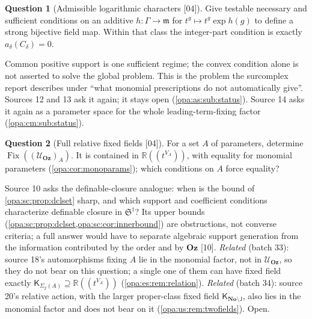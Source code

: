 \documentclass[11pt,oneside]{article}
\numberwithin{equation}{section}
\theoremstyle{definition}
\newtheorem{question}[question]{Question}
\theoremstyle{remark}
\newcommand{\No}{\mathbf{No}}
\newcommand{\Oz}{\mathbf{Oz}}
\newcommand{\R}{\mathbb R}
\newcommand{\mm}{\mathfrak m}
\newcommand{\UU}{\mathcal U}
\newcommand{\Fix}{\operatorname{Fix}}
\newcommand{\Hahn}[2]{#1((t^{#2}))}
\newcommand{\src}[1]{\textup{\textsf{\small[#1]}}}
\begin{document}
\begin{question}[Admissible logarithmic characters \src{04}]\label{opa:q:characters}
Give testable necessary and sufficient conditions on an additive $h:\Gamma\to\mm$
for $t^g\mapsto t^g\exp h(g)$ to define a strong bijective field map. Within that
class the integer-part condition is exactly $a_\delta(C_\delta)=0$.
\end{question}
Common positive support is one sufficient regime; the convex condition alone is not
asserted to solve the global problem. This is the problem the surcomplex report
describes under ``what monomial prescriptions do not automatically give''. Sources
12 and 13 ask it again; it stays open (\cref{opa:as:sub:status}). Source 14 asks it again
as a parameter space for the whole leading-term-fixing factor (\cref{opa:cm:sub:status}).

\begin{question}[Full relative fixed fields \src{04}]\label{opa:q:relative}
For a set $A$ of parameters, determine $\Fix((\UU_\Oz)_A)$. It is contained in
$\Hahn\R{V_A}$, with equality for monomial parameters
(\cref{opa:cor:monoparams}); which conditions on $A$ force equality?
\end{question}
Source 10 asks the definable-closure analogue: when is the bound of
\cref{opa:sc:prop:dclset} sharp, and which support and coefficient conditions
characterize definable closure in $\mathfrak S^\dagger$? Its upper bounds
(\cref{opa:sc:prop:dclset,opa:sc:cor:innerbound}) are obstructions, not converse
criteria; a full answer would have to separate algebraic support generation from
the information contributed by the order and by $\Oz$ \src{10}. \emph{Related} (batch 33):
source 18's automorphisms fixing $A$ lie in the monomial factor, not in $\UU_\Oz$, so they do
not bear on this question; a single one of them can have fixed field exactly
$\mathsf K_{\Sigma_2(A)}\supseteq\Hahn\R{V_A}$ (\cref{opa:es:rem:relation}). \emph{Related} (batch 34): source 20's
relative action, with the larger proper-class fixed field $\mathsf K_{\No\setminus\mathsf J}$, also lies in the monomial factor and
does not bear on it (\cref{opa:us:rem:twofields}). Open.
\end{document}
